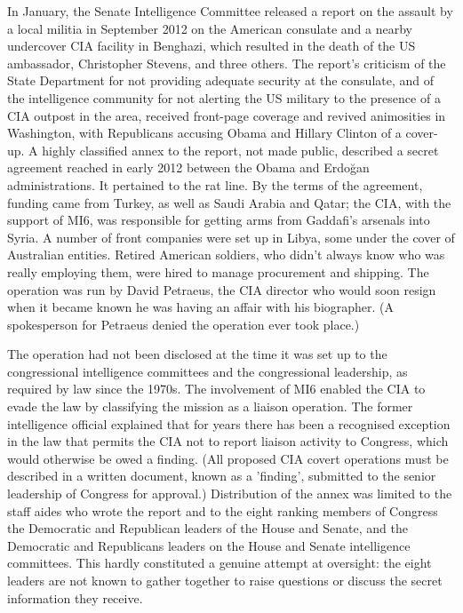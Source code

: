 In January, the Senate Intelligence Committee released a report on
the assault by a local militia in September 2012 on the American consulate
and a nearby undercover CIA facility in Benghazi, which resulted in
the death of the US ambassador, Christopher Stevens, and three others.
The report's criticism of the State Department for not providing adequate
security at the consulate, and of the intelligence community for not
alerting the US military to the presence of a CIA outpost in the area,
received front-page coverage and revived animosities in Washington,
with Republicans accusing Obama and Hillary Clinton of a cover-up.
A highly classified annex to the report, not made public, described
a secret agreement reached in early 2012 between the Obama and Erdo\u{g}an
administrations. It pertained to the rat line. By the terms of the
agreement, funding came from Turkey, as well as Saudi Arabia and Qatar;
the CIA, with the support of MI6, was responsible for getting arms
from Gaddafi's arsenals into Syria. A number of front companies were
set up in Libya, some under the cover of Australian entities. Retired
American soldiers, who didn't always know who was really employing
them, were hired to manage procurement and shipping. The operation
was run by David Petraeus, the CIA director who would soon resign
when it became known he was having an affair with his biographer.
(A spokesperson for Petraeus denied the operation ever took place.)

The operation had not been disclosed at the time it was set up to
the congressional intelligence committees and the congressional leadership,
as required by law since the 1970s. The involvement of MI6 enabled
the CIA to evade the law by classifying the mission as a liaison operation.
The former intelligence official explained that for years there has
been a recognised exception in the law that permits the CIA not to
report liaison activity to Congress, which would otherwise be owed
a finding. (All proposed CIA covert operations must be described in
a written document, known as a 'finding', submitted to the senior
leadership of Congress for approval.) Distribution of the annex was
limited to the staff aides who wrote the report and to the eight ranking
members of Congress \textendash{} the Democratic and Republican leaders
of the House and Senate, and the Democratic and Republicans leaders
on the House and Senate intelligence committees. This hardly constituted
a genuine attempt at oversight: the eight leaders are not known to
gather together to raise questions or discuss the secret information
they receive.

